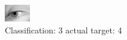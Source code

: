\begin{figure}[h!]
\begin{center}
\includegraphics[width=0.60\columnwidth]{figures/ID2919_class_3_target_4.png}
\end{center}
\caption{ Classification: 3 actual target: 4}
\label{fig:ID2919_class_3_target_4}
\end{figure}
